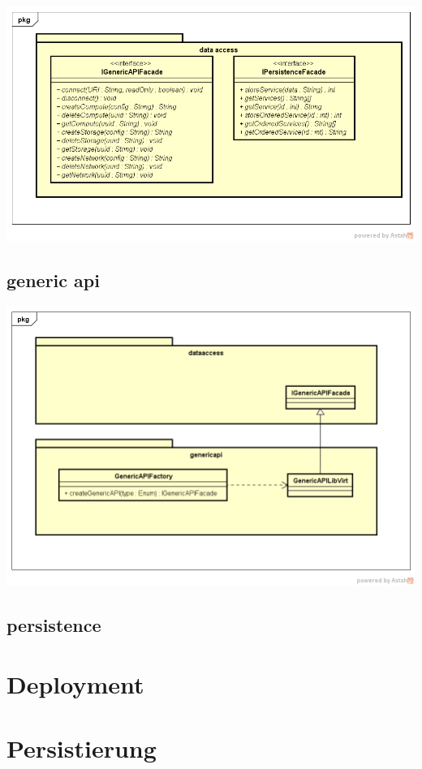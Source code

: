 \documentclass[11pt]{scrartcl}
\begin{document}
\begin{center}
\includegraphics[scale=0.5]{Klassenstruktur-dataaccess}
\end{center}


\subsection{generic api}

\begin{center}
\includegraphics[scale=0.5]{Klassenstruktur-genericapi}
\end{center}

\subsection{persistence}

\section{Deployment}

\section{Persistierung}
\end{document}
